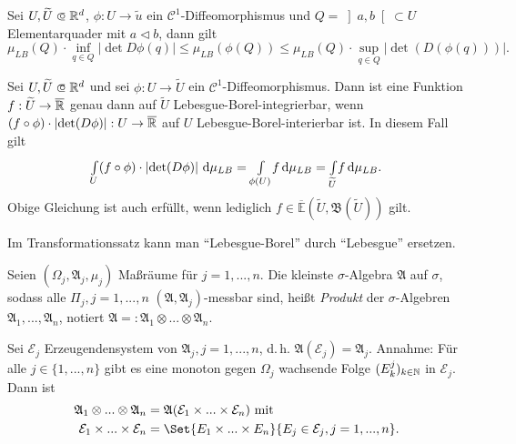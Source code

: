\documentclass{cheat-sheet}
\newcommand{\ER}{\overline\R} %
\newcommand{\Alg}{\mathfrak{A}} %
\newcommand{\Bor}{\mathfrak{B}} %
\newcommand{\E}{\mathbb{E}} %
\begin{document}
\begin{satz}
  Sei $U, \widetilde{U} \opn \R^d$, $\phi : U \to \widetilde{u}$ ein $\mathcal{C}^1$-Diffeomorphismus und $Q = \left]a, b\right[ \subset U$ Elementarquader mit $a \lhd b$, dann gilt
  \[ \mu_{LB}(Q) \cdot \inf_{q \in Q} \left|\det D \phi(q)\right| \leq \mu_{LB}(\phi(Q)) \leq \mu_{LB}(Q) \cdot \sup_{q \in Q} \left|\det(D(\phi(q)))\right|. \]
\end{satz}

\begin{satz}[Transformationssatz]
  Sei $U, \widetilde{U} \opn \R^d$ und sei $\phi : U \to \widetilde{U}$ ein $\mathcal{C}^1$-Diffeomorphismus. Dann ist eine Funktion $f : \widetilde{U} \to \ER$ genau dann auf $\widetilde{U}$ Lebesgue-Borel-integrierbar, wenn $(f \circ \phi) \cdot \left|\det(D\phi)\right| : U \to \ER$ auf $U$ Lebesgue-Borel-interierbar ist. In diesem Fall gilt
  \[ {\textstyle \int\limits_{U}^{}} (f \circ \phi) \cdot \left|\det(D\phi)\right| \,\mathrm{d} \mu_{LB} = {\textstyle \int\limits_{\phi(U)}^{}} f \,\mathrm{d} \mu_{LB} = {\textstyle \int\limits_{\widetilde{U}}^{}} f \,\mathrm{d} \mu_{LB}. \]
  Obige Gleichung ist auch erfüllt, wenn lediglich $f \in \overline{\E}(\widetilde{U}, \Bor(\widetilde{U}))$ gilt.
\end{satz}

\begin{bem}
  Im Transformationssatz kann man "`Lebesgue-Borel"' durch "`Lebesgue"' ersetzen.
\end{bem}



% 

\begin{defn}
  Seien $(\Omega_j, \Alg_j, \mu_j)$ Maßräume für $j = 1, ..., n$. Die kleinste $\sigma$-Algebra $\Alg$ auf $\sigma$, sodass alle $\Pi_j, j = 1, ..., n$ $(\Alg, \Alg_j)$-messbar sind, heißt \emph{Produkt} der $\sigma$-Algebren $\Alg_1, ..., \Alg_n$, notiert $\Alg =: \Alg_1 \otimes ... \otimes \Alg_n$.
\end{defn}

\begin{satz}
  Sei $\mathcal{E}_j$ Erzeugendensystem von $\Alg_j, j = 1, ..., n$, d.\,h. $\Alg(\mathcal{E}_j) = \Alg_j$. Annahme: Für alle $j \in \{ 1, ..., n \}$ gibt es eine monoton gegen $\Omega_j$ wachsende Folge $(E^j_k)_{k \in \mathbb{N}}$ in $\mathcal{E}_j$. Dann ist
  \begin{align*}
    \Alg_1 \otimes ... \otimes \Alg_n &= \Alg(\mathcal{E}_1 \times ... \times \mathcal{E}_n) \text{ mit }\\
    \mathcal{E}_1 \times ... \times \mathcal{E}_n &= \Set{ E_1 \times ... \times E_n }{ E_j \in \mathcal{E}_j, j = 1, ..., n }.
  \end{align*}
\end{satz}
\end{document}
